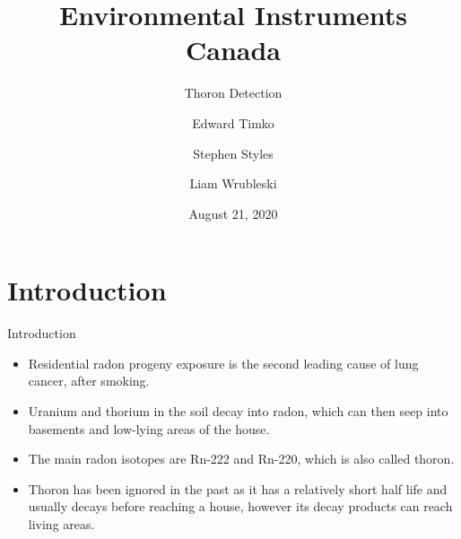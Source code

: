 \documentclass{beamer}
\title[Thoron Detection] %
{Environmental Instruments Canada}
\subtitle
{ Thoron Detection}
\author[E. Timko, S. Styles, L. Wrubleski]{Edward Timko\inst{1} \and Stephen Styles\inst{2} \and Liam Wrubleski\inst{3}} %
\institute[PIMS] %
{
  \inst{1}%
  Dept. of Mathematics\\
  University of Manitoba
  \and
  \inst{2}%
  Dept. of Mathematics and Statistics\\
  University of Alberta
  \and
  \inst{3}%
  Dept. of Electrical and Computer Engineering\\
  University of Calgary
}
\date{August 21, 2020}
\begin{document}
\begin{frame}
\maketitle
\begin{center}
\end{center}

\end{frame}
\section{Introduction}

\begin{frame}{Introduction}
\begin{itemize}
    \item Residential radon progeny exposure is the second leading cause of lung cancer, after smoking.
    \item Uranium and thorium in the soil decay into radon, which can then seep into basements and low-lying areas of the house.
    \item The main radon isotopes are Rn-222 and Rn-220, which is also called thoron.
\item Thoron has been ignored in the past as it has a relatively short half life and usually decays before reaching a house, however its decay products can reach living areas.
\end{itemize}
\end{frame}
\end{document}
